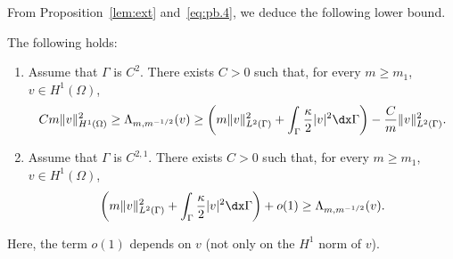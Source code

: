 From Proposition~\ref{lem:ext} and~\eqref{eq:pb.4}, we deduce the following lower bound.
\begin{corollary}\label{pub:leading}
The following holds:
\begin{enumerate}[label=(\roman*)]
\item Assume that $\Gamma$ is $C^2$. There exists $C>0$ such that, for every $m\geq m_1$, $v\in H^1(\Omega)$,
\[Cm\|v\|_{H^1(\Omega)}^2\geq\Lambda_{m,m^{-1/2}}(v)\geq\left(m\|v\|_{L^2(\Gamma)}^2+\int_\Gamma\frac\kappa2|v|^2\dx\Gamma\right)-\frac Cm\|v\|_{L^2(\Gamma)}^2.\]
\item Assume that $\Gamma$ is $C^{2,1}$. There exists $C>0$ such that, for every $m\geq m_1$, $v\in H^1(\Omega)$,
\[\left(m\|v\|_{L^2(\Gamma)}^2+\int_\Gamma\frac\kappa2|v|^2\dx\Gamma\right)+o(1)\geq\Lambda_{m,m^{-1/2}}(v).\]
\end{enumerate}
Here, the term $o(1)$ depends on $v$ (not only on the $H^1$ norm of $v$).
\end{corollary}
